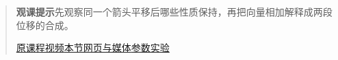\begin{quote}\small\textbf{观课提示}\quad 先观察同一个箭头平移后哪些性质保持，再把向量相加解释成两段位移的合成。

\href{https://www.youtube.com/watch?v=fNk_zzaMoSs}{原课程视频}\quad\href{https://vitael04213.github.io/3blue1brown-notes/lessons/vectors.html}{本节网页与媒体}\quad\href{https://vitael04213.github.io/3blue1brown-notes/lab.html\#vectors}{参数实验}
\end{quote}
